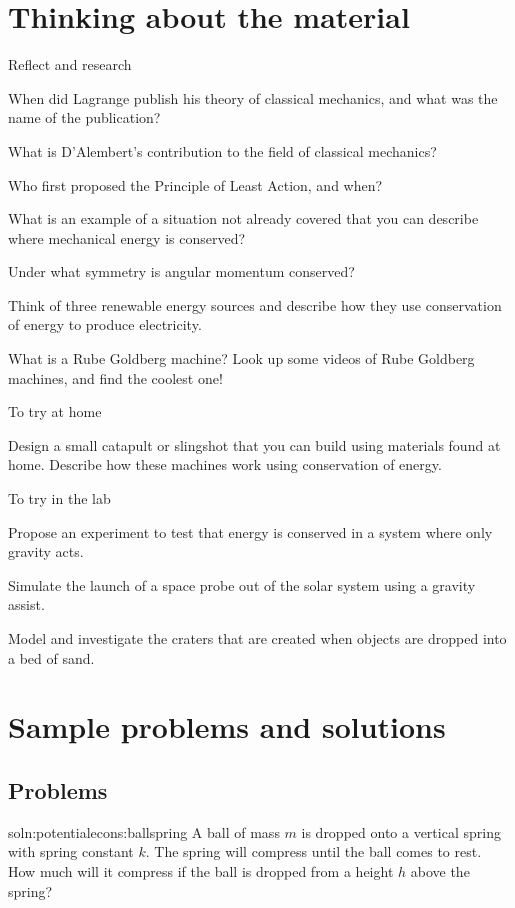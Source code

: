 \newpage
\section{Thinking about the material}
\begin{chapteractivity}{Reflect and research}
{
\item When did Lagrange publish his theory of classical mechanics, and what was the name of the publication?
\item What is D'Alembert's contribution to the field of classical mechanics?
\item Who first proposed the Principle of Least Action, and when?
\item What is an example of a situation not already covered that you can describe where mechanical energy is conserved?
\item Under what symmetry is angular momentum conserved?
\item Think of three renewable energy sources and describe how they use conservation of energy to produce electricity. 
\item What is a Rube Goldberg machine? Look up some videos of Rube Goldberg machines, and find the coolest one!
}
\end{chapteractivity}

\begin{chapteractivity}{To try at home}
{
\item Design a small catapult or slingshot that you can build using materials found at home. Describe how these machines work using conservation of energy.
}
\end{chapteractivity}

\begin{chapteractivity}{To try in the lab}
{
\item Propose an experiment to test that energy is conserved in a system where only gravity acts.
\item Simulate the launch of a space probe out of the solar system using a gravity assist.
\item Model and investigate the craters that are created when objects are dropped into a bed of sand.
}
\end{chapteractivity}
\newpage
\section{Sample problems and solutions}
\subsection{Problems}
\begin{problem}{soln:potentialecons:ballspring}{\label{prob:potentialecons:ballspring} A ball of mass $m$ is dropped onto a vertical spring with spring constant $k$. The spring will compress until the ball comes to rest. How much will it compress if the ball is dropped from a height $h$ above the spring?}
\end{problem}


